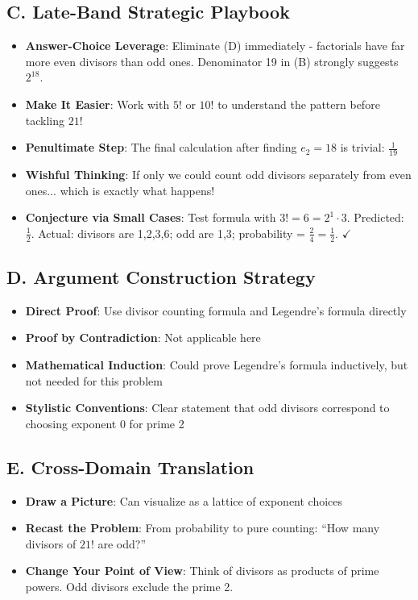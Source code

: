 \documentclass[]{article}
\begin{document}
\begin{strategicbox}
\subsection*{C. Late-Band Strategic Playbook}
\begin{itemize}[leftmargin=*]
    \item \textbf{Answer-Choice Leverage}: Eliminate (D) immediately - factorials have far more even divisors than odd ones. Denominator 19 in (B) strongly suggests $2^{18}$.
    \item \textbf{Make It Easier}: Work with $5!$ or $10!$ to understand the pattern before tackling $21!$
    \item \textbf{Penultimate Step}: The final calculation after finding $e_2 = 18$ is trivial: $\frac{1}{19}$
    \item \textbf{Wishful Thinking}: If only we could count odd divisors separately from even ones... which is exactly what happens!
    \item \textbf{Conjecture via Small Cases}: Test formula with $3! = 6 = 2^1 \cdot 3$. Predicted: $\frac{1}{2}$. Actual: divisors are 1,2,3,6; odd are 1,3; probability = $\frac{2}{4} = \frac{1}{2}$. $\checkmark$
\end{itemize}

\subsection*{D. Argument Construction Strategy}
\begin{itemize}[leftmargin=*]
    \item \textbf{Direct Proof}: Use divisor counting formula and Legendre's formula directly
    \item \textbf{Proof by Contradiction}: Not applicable here
    \item \textbf{Mathematical Induction}: Could prove Legendre's formula inductively, but not needed for this problem
    \item \textbf{Stylistic Conventions}: Clear statement that odd divisors correspond to choosing exponent 0 for prime 2
\end{itemize}

\subsection*{E. Cross-Domain Translation}
\begin{itemize}[leftmargin=*]
    \item \textbf{Draw a Picture}: Can visualize as a lattice of exponent choices
    \item \textbf{Recast the Problem}: From probability to pure counting: ``How many divisors of $21!$ are odd?''
    \item \textbf{Change Your Point of View}: Think of divisors as products of prime powers. Odd divisors exclude the prime 2.
\end{itemize}
\end{strategicbox}
\end{document}

